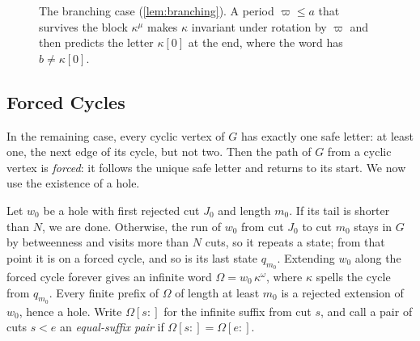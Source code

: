 \begin{figure}[t]
\centering
{}
\caption{The branching case (\cref{lem:branching}). A period $\varpi \le a$ that survives the
block $\kappa^\mu$ makes $\kappa$ invariant under rotation by $\varpi$ and then predicts the letter $\kappa[0]$ at
the end, where the word has $b \ne \kappa[0]$.}
\label{fig:branching}
\end{figure}

\subsection{Forced Cycles}

In the remaining case, every cyclic vertex of $G$ has exactly one safe letter: at least one,
the next edge of its cycle, but not two. Then the path of $G$ from a cyclic
vertex is \emph{forced}: it follows the unique safe letter and returns to its start. We now
use the existence of a hole.

Let $w_0$ be a hole with first rejected cut $J_0$ and length $m_0$. If its tail is shorter
than $N$, we are done. Otherwise, the run of $w_0$ from cut $J_0$ to cut $m_0$ stays in
$G$ by betweenness and visits more than $N$ cuts, so it repeats a state; from
that point it is on a forced cycle, and so is its last state $q_{m_0}$. Extending $w_0$
along the forced cycle forever gives an infinite word $\Omega = w_0\,\kappa^\omega$, where $\kappa$ spells
the cycle from $q_{m_0}$. Every finite prefix of $\Omega$ of length at least $m_0$ is a
rejected extension of $w_0$, hence a hole. Write $\Omega[s{:}]$ for the infinite suffix from cut
$s$, and call a pair of cuts $s < e$ an \emph{equal-suffix pair} if $\Omega[s{:}] = \Omega[e{:}]$.

